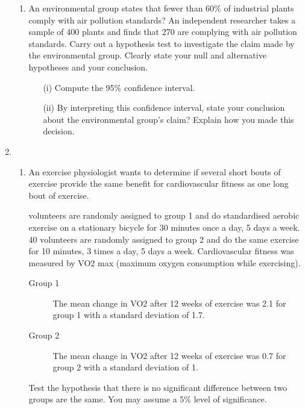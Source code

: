 \documentclass[a4paper,12pt]{article}
\begin{document}
\begin{enumerate}
\begin{enumerate}
	\item An environmental group states that fewer than 60\% of industrial plants comply with air pollution standards? An independent researcher takes a sample of 400 plants and finds that 270 are complying with air pollution standards. Carry out a hypothesis test to investigate the claim made by the environmental group. Clearly state your null and alternative hypotheses and your conclusion.
	\begin{itemize}
		\item[(i)] Compute the 95\% confidence interval.
		\item[(ii)] By interpreting this confidence interval, state your conclusion about the environmental group's claim? Explain how you made this decision.
	\end{itemize}
\end{enumerate}

\item
\begin{enumerate}
	\item An exercise physiologist wants to determine if several short bouts of exercise provide the same benefit for cardiovascular fitness as one long bout of exercise. \\ \smallskip
	
	 volunteers are randomly assigned to group 1 and do standardised aerobic exercise on a stationary bicycle for 30 minutes once a day, 5 days a week. 40 volunteers are randomly assigned to group 2 and do the same exercise for 10 minutes, 3 times a day, 5 days a week. Cardiovascular fitness was measured by VO2 max (maximum oxygen consumption while exercising). 
	
	\begin{description}
		\item[Group 1] The mean change in VO2 after 12 weeks of exercise was 2.1 for group 1 with a standard deviation of 1.7.
		\item[Group 2] The mean change in VO2 after 12 weeks of exercise was 0.7 for group 2 with a standard deviation of 1. 
	\end{description}
	
	\noindent Test the hypothesis that there is no significant difference between two groups are the same. You may assume a 5\% level of significance.
	

\end{enumerate}
\end{enumerate}
\end{document}
